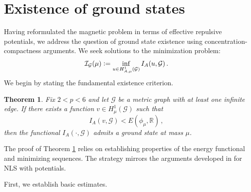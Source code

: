 \documentclass[12pt,a4paper]{amsart}
\theoremstyle{definition}
\theoremstyle{plain}
\newtheorem{theorem}[definition]{Theorem}
\newcommand{\defeq}{\vcentcolon=}
\numberwithin{equation}{section}
\begin{document}
\section{Existence of ground states}
\label{Sec5}

Having reformulated the magnetic problem in terms of effective repulsive potentials, we address the question of ground state existence using concentration-compactness arguments. We seek solutions to the minimization problem:
\begin{equation}
    \label{infprob}
         \mathcal{I}_\mathcal{G}(\mu) \defeq \inf_{u \in H^1_{A,\mu}(\mathcal{G})} I_A(u, \mathcal{G})\,.
\end{equation}
We begin by stating the fundamental existence criterion.

\begin{theorem}
\label{existencecrit}
Fix $2 < p < 6$ and let $\mathcal{G}$ be a metric graph with at least one infinite edge. If there exists a function $v \in H^1_{\mu}(\mathcal{G})$ such that 
\begin{equation}
  I_A(v, \mathcal{G})  < E(\phi_{\mu}, \mathbb{R})\,,
  \label{criterion}
\end{equation}
then the functional $I_A(\cdot, \mathcal{G})$ admits a ground state at mass $\mu$.
\end{theorem}

The proof of Theorem \ref{existencecrit} relies on establishing properties of the energy functional and minimizing sequences. The strategy mirrors the arguments developed in \cite{Adami2025} for NLS with potentials.

First, we establish basic estimates.
\end{document}
